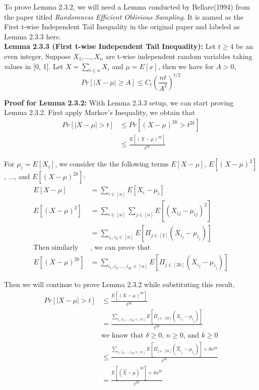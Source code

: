 \documentclass[a4paper, english]{paper}
\begin{document}
 To prove Lemma 2.3.2, we will need a Lemma conducted by Bellare(1994) from the paper titled \textit{Randomness Efficient Oblivious Sampling}. It is named as the First t-wise Independent Tail Inequality in the original paper and labeled as Lemma 2.3.3 here. \\

	\noindent\textbf{Lemma 2.3.3 (First t-wise Independent Tail Inequality):} Let $t \ge 4$ be an even integer, Suppose $X_1, ..., X_n$ are t-wise independent random variables taking values in [0, 1]. Let $X = \sum_{i \in n} X_i$ and $\mu = E[x]$, then we have for $A > 0$,
	$$Pr[|X-\mu| \ge A] \le C_t (\frac{nt}{A^2})^{t/2}$$

	 \noindent\textbf{Proof for Lemma 2.3.2:} With Lemma 2.3.3 setup, we can start proving Lemma 2.3.2. First apply Markov's Inequality, we obtain that
	 \begin{align*}
	 	Pr\left[|X - \mu| > t\right]  &\le Pr\left[\left(X - \mu\right)^{2k} > t^{2k}\right]\\
	 	& \le \frac{E[(X-\mu)^{2k}]}{t^{2k}}
	\end{align*}\par
	For $\mu_i = E[X_i]$, we consider the the following terms $E[X-\mu]$, $E[(X-\mu)^2]$, ..., and $E[(X-\mu)^{2k}]$:
	\begin{align*}
		E[X-\mu] &=\sum_{i\in[n]} E[X_i - \mu_i] \\
		E[(X-\mu)^2]  &= \sum_{i \in [n]} \sum_{j \in [n]} E[(X_{ij} - \mu_{ij})^2] \\
		&=\sum_{i_1, i_2 \in [n]} E[\Pi_{j \in [2]}(X_{i_j}-\mu_{i_j})] \\
		 \text{Then similarly} & \text{, we can prove that } \\
		E[(X-\mu)^{2k}] &= \sum_{i_1, i_2, ..., i_{2k} \in [n]} E[\Pi_{j \in [2k]}(X_{i_j}-\mu_{i_j})]
	\end{align*}\par
	Then we will continue to prove Lemma 2.3.2 while substituting this result,
	\begin{align*}
	 	Pr\left[|X - \mu| > t\right]  & \le \frac{E[(X-\mu)^{2k}]}{t^{2k}} \\
		&= \frac{\sum_{i_1, i_2, ..., i_{2k} \in [n]} E[\Pi_{j \in [2k]}(X_{i_j}-\mu_{i_j})]}{t^{2k}} \\
		& \text{we know that $\delta \ge 0$, $n \ge 0$, and $k \ge 0$} \\
		& \le \frac{\sum_{i_1, i_2, ..., i_{2k} \in [n]} E[\Pi_{j \in [2k]}(\hat{X}_{i_j}-\mu_{i_j})] + \delta n^{2k}}{t^{2k}} \\
		& = \frac{E[(\hat{X}-\mu)^{2k}] + \delta n^{2k}}{t^{2k}}
	 \end{align*}\par
\end{document}

